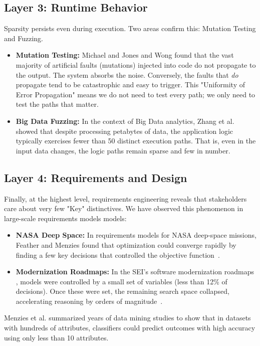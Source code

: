 \documentclass[runningheads]{llncs}
\begin{document}
\subsection{Layer 3: Runtime Behavior}
Sparsity persists even during execution. Two areas confirm this: Mutation 
Testing and Fuzzing.
\begin{itemize}
    \item \textbf{Mutation Testing:} Michael and Jones 
    \cite{michael1997uniformity} and Wong \cite{wong1995reducing} found that 
    the vast majority of artificial faults (mutations) injected into code 
    do not propagate to the output. The system absorbs the noise. Conversely, 
    the faults that \textit{do} propagate tend to be catastrophic and easy to 
    trigger. This "Uniformity of Error Propagation" means we do not need to 
    test every path; we only need to test the paths that matter.
    \item \textbf{Big Data Fuzzing:} In the context of Big Data analytics, 
    Zhang et al. \cite{Zhang20BigFuzz} showed that despite processing petabytes 
    of data, the application logic typically exercises fewer than 50 distinct 
    execution paths. That is, even in the input data changes,  the logic paths remain sparse and few in number.
\end{itemize}

\subsection{Layer 4: Requirements and Design}
Finally, at the highest level, requirements engineering reveals that stakeholders 
care about very few "Key" distinctives. 
 We have observed this phenomenon in
large-scale requirements models models:

\begin{itemize}
    \item \textbf{NASA Deep Space:} In requirements models for NASA
    deep-space missions, Feather and Menzies found that optimization
    could converge rapidly by finding a few key decisions that
    controlled the objective function~\cite{Feather02}.

    \item \textbf{Modernization Roadmaps:} In the SEI's software modernization roadmaps \cite{ernst2016}, models were controlled
    by a small set of variables (less than 12\% of decisions). Once these
    were set, the remaining search space collapsed, accelerating
    reasoning by orders of magnitude~\cite{Mathews17}.
\end{itemize}
Menzies et al. \cite{MenziesKeys21} 
summarized years of data mining studies to show that in datasets with hundreds 
of attributes, classifiers could predict outcomes with high accuracy using 
only less than 10 attributes.
\end{document}
